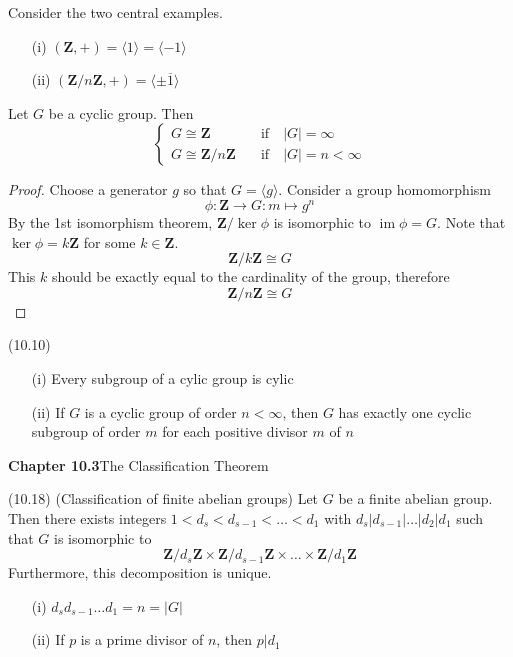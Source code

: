 \vspace{2ex}
\begin{ex}
Consider the two central examples.
\begin{itemize}
\item[(i)] $({\bm Z},+)=\langle 1\rangle =\langle -1\rangle $
\item[(ii)] $({\bm Z}/n{\bm Z},+)=\langle \pm \overline{1}\rangle $
\end{itemize}
\end{ex}
\vspace{2ex}
\begin{prop}
Let $G$ be a cyclic group. Then
\[\begin{cases}
G \cong {\bm Z} &\quad\mathrm{if}\quad |G|=\infty \\
G\cong {\bm Z}/n{\bm Z}&\quad \mathrm{if}\quad |G|=n<\infty 
\end{cases}\]
\end{prop}
\vspace{2ex}
\begin{proof}
Choose a generator $g$ so that $G=\langle g\rangle $. Consider a group homomorphism 
\[\phi :{\bm Z}\rightarrow G:m\mapsto g^{n}\]
By the 1st isomorphism theorem, ${\bm Z}/\mathop{\mathrm{ker}}\phi $ is isomorphic to $\mathop{\mathrm{im}}\phi =G$. Note that $\mathop{\mathrm{ker}}\phi =k{\bm Z}$ for some $k\in {\bm Z}$. 
\[{\bm Z}/k{\bm Z}\cong G\]
This $k$ should be exactly equal to the cardinality of the group, therefore 
\[{\bm Z}/n{\bm Z}\cong G\]
\end{proof}
\vspace{2ex}
\begin{prop}
(10.10) 
\begin{itemize}
\item[(i)] Every subgroup of a cylic group is cylic
\item[(ii)] If $G$ is a cyclic group of order $n<\infty $, then $G$ has exactly one cyclic subgroup of order $m$ for each positive divisor $m$ of $n$
\end{itemize}
\end{prop}
\vspace{2ex}
{\bf Chapter 10.3}\hspace{2ex}The Classification Theorem
\newline
\begin{thm}
(10.18) (Classification of finite abelian groups) Let $G$ be a finite abelian group. Then there exists integers $1<d_{s}<d_{s-1}<\ldots <d_1$ with $d_{s}|d_{s-1}|\ldots |d_2|d_1$ such that $G$ is isomorphic to
\[{\bm Z}/d_{s}{\bm Z}\times {\bm Z}/d_{s-1}{\bm Z}\times \ldots \times {\bm Z}/d_1{\bm Z}\]
Furthermore, this decomposition is unique.
\end{thm}
\vspace{2ex}
\begin{rmk}
\begin{itemize}
\item[(i)] $d_{s}d_{s-1}\ldots d_{1}=n=|G|$
\item[(ii)] If $p$ is a prime divisor of $n$, then $p|d_1$
\end{itemize}
\end{rmk}
\vspace{2ex}


